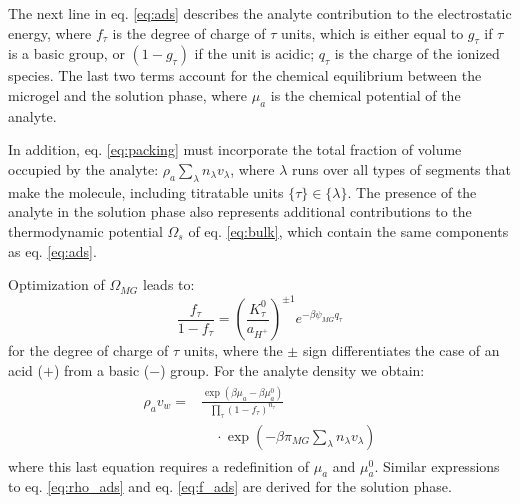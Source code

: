 The next line in eq. \ref{eq:ads} describes the analyte contribution to the electrostatic energy, where $f_\tau$ is the degree of charge of $\tau$ units, which is either equal to $g_\tau$ if $\tau$ is a basic group, or $(1-g_\tau)$ if the unit is acidic; $q_\tau$ is the charge of the ionized species.
The last two terms account for the chemical equilibrium between the microgel and the solution phase, where $\mu_a$ is the chemical potential of the analyte.



In addition, eq. \ref{eq:packing} must incorporate the total fraction of volume occupied by the analyte: $\rho_a \sum_\lambda n_\lambda v_\lambda$, where $\lambda$ runs over all types of segments that make the molecule, including titratable units $\{\tau\}\in\{\lambda\}$.
The presence of the analyte in the solution phase also represents additional contributions to the thermodynamic potential $\Omega_s$ of eq. \ref{eq:bulk}, which contain the same components as eq. \ref{eq:ads}. 


Optimization of $\Omega_{MG}$  leads to:
%
\begin{equation}
\frac{f_\tau}{1-f_\tau}=\left(\frac{K^0_\tau}{a_{H^+}}\right)^{\pm 1} e^{-\beta \psi_{MG} q_\tau}
\label{eq:f_ads}
\end{equation}
%
\noindent for the degree of charge of $\tau$ units, where the $\pm$ sign differentiates the case of an acid ($+$) from a basic ($-$) group.
For the analyte density we obtain:
%
\begin{align}
    \begin{aligned}
   \rho_a v_w =&\frac{ \exp{\left(\beta \mu_a - \beta \mu^0_a \right)}}{\prod_\tau \left(1-f_\tau\right)^{n_\tau}}\\
&\quad \cdot\exp{\left(-\beta \pi_{MG} \sum_\lambda n_\lambda v_\lambda \right)} 
    \end{aligned}\label{eq:rho_ads}
\end{align}
%
\noindent where this last equation requires a redefinition of $\mu_a$ and $\mu_a^0$.
Similar expressions to eq. \ref{eq:rho_ads} and eq. \ref{eq:f_ads} are derived for the solution phase.







